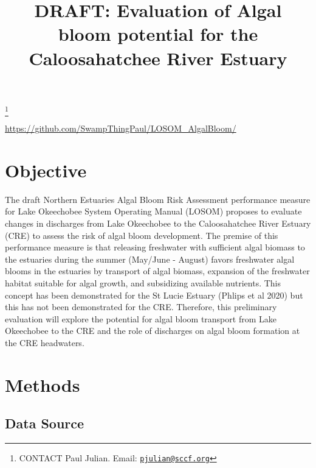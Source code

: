 \documentclass[]{interact}
\theoremstyle{plain}%
\theoremstyle{definition}
\theoremstyle{remark}
\begin{document}

\title{DRAFT: Evaluation of Algal bloom potential for the Caloosahatchee
River Estuary}


\author{
}

\thanks{CONTACT Paul
Julian. Email: \href{mailto:pjulian@sccf.org}{\nolinkurl{pjulian@sccf.org}}}

\maketitle



\begin{github}
\url{https://github.com/SwampThingPaul/LOSOM_AlgalBloom/}
\end{github}

\hypertarget{objective}{%
\section{Objective}\label{objective}}

The draft Northern Estuaries Algal Bloom Risk Assessment performance
measure for Lake Okeechobee System Operating Manual (LOSOM) proposes to
evaluate changes in discharges from Lake Okeechobee to the
Caloosahatchee River Estuary (CRE) to assess the risk of algal bloom
development. The premise of this performance measure is that releasing
freshwater with sufficient algal biomass to the estuaries during the
summer (May/June - August) favors freshwater algal blooms in the
estuaries by transport of algal biomass, expansion of the freshwater
habitat suitable for algal growth, and subsidizing available nutrients.
This concept has been demonstrated for the St Lucie Estuary (Phlips et
al 2020) but this has not been demonstrated for the CRE. Therefore, this
preliminary evaluation will explore the potential for algal bloom
transport from Lake Okeechobee to the CRE and the role of discharges on
algal bloom formation at the CRE headwaters.

\hypertarget{methods}{%
\section{Methods}\label{methods}}

\hypertarget{data-source}{%
\subsection{Data Source}\label{data-source}}
\end{document}
